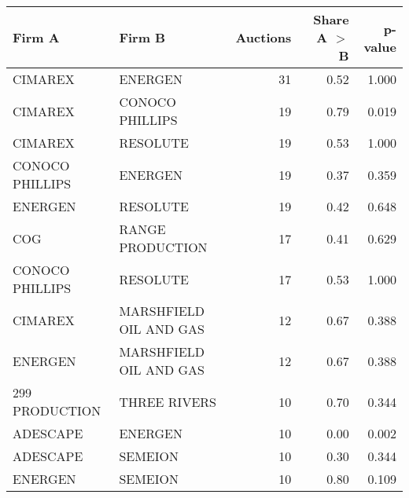 
\begin{tabular}{llrrr}
\toprule
Firm A & Firm B & Auctions & Share A $>$ B & p-value\\
\midrule
CIMAREX & ENERGEN & 31 & 0.52 & 1.000\\
CIMAREX & CONOCO PHILLIPS & 19 & 0.79 & 0.019\\
CIMAREX & RESOLUTE & 19 & 0.53 & 1.000\\
CONOCO PHILLIPS & ENERGEN & 19 & 0.37 & 0.359\\
ENERGEN & RESOLUTE & 19 & 0.42 & 0.648\\
COG & RANGE PRODUCTION & 17 & 0.41 & 0.629\\
CONOCO PHILLIPS & RESOLUTE & 17 & 0.53 & 1.000\\
CIMAREX & MARSHFIELD OIL AND GAS & 12 & 0.67 & 0.388\\
ENERGEN & MARSHFIELD OIL AND GAS & 12 & 0.67 & 0.388\\
299 PRODUCTION & THREE RIVERS & 10 & 0.70 & 0.344\\
ADESCAPE & ENERGEN & 10 & 0.00 & 0.002\\
ADESCAPE & SEMEION & 10 & 0.30 & 0.344\\
ENERGEN & SEMEION & 10 & 0.80 & 0.109\\
\bottomrule
\end{tabular}
